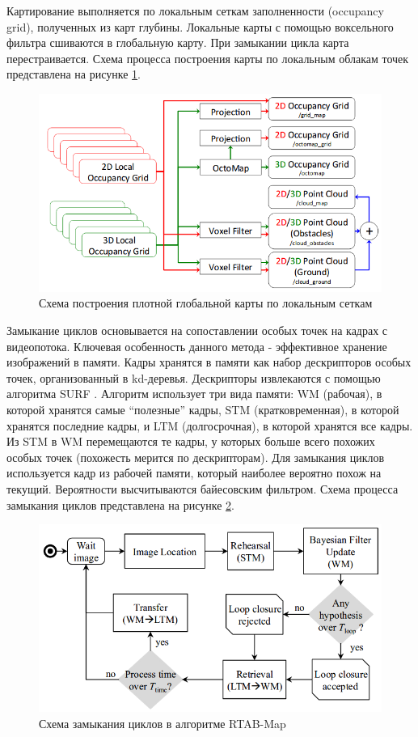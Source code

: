 \documentclass{mipt-thesis-ms}
\begin{document}
	Картирование выполняется по локальным сеткам заполненности (occupancy grid), полученных из карт глубины. Локальные карты с помощью воксельного фильтра сшиваются в глобальную карту. При замыкании цикла карта перестраивается. Схема процесса построения карты по локальным облакам точек представлена на рисунке \ref{figuremapping}.
	
	\begin{figure}
		\centering
		\includegraphics[scale=0.5]{img/rtabmap_mapping.png}
		\caption{Схема построения плотной глобальной карты по локальным сеткам}
		\label{figuremapping}
	\end{figure}
	
	Замыкание циклов основывается на сопоставлении особых точек на кадрах с видеопотока. Ключевая особенность данного метода - эффективное хранение изображений в памяти. Кадры хранятся в памяти как набор дескрипторов особых точек, организованный в kd-деревья. Дескрипторы извлекаются с помощью алгоритма SURF \cite{bay2006surf}. Алгоритм использует три вида памяти: WM (рабочая), в которой хранятся самые “полезные” кадры, STM (кратковременная), в которой хранятся последние кадры, и LTM (долгосрочная), в которой хранятся все кадры. Из STM в WM перемещаются те кадры, у которых больше всего похожих особых точек (похожесть мерится по дескрипторам). Для замыкания циклов используется кадр из рабочей памяти, который наиболее вероятно похож на текущий. Вероятности высчитываются байесовским фильтром. Схема процесса замыкания циклов представлена на рисунке \ref{figureloopclosing}.
	
	\begin{figure}
		\centering
		\includegraphics[scale=0.5]{img/rtabmap_loopclosure.png}
		\caption{Схема замыкания циклов в алгоритме RTAB-Map}
		\label{figureloopclosing}
	\end{figure}
	
\end{document}
